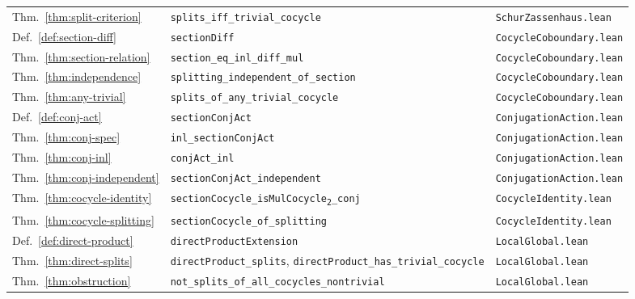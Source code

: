 \documentclass[11pt]{article}
\newcommand{\lean}[1]{\texttt{#1}}
\begin{document}
\begin{longtable}{@{}>{\raggedright\arraybackslash}p{}
  >{\raggedright\arraybackslash}p{}
  >{\raggedright\arraybackslash}p{}@{}}
Thm.~\ref{thm:split-criterion} &
  \lean{splits\_iff\_trivial\_cocycle} &
  \lean{SchurZassenhaus.lean} \\

Def.~\ref{def:section-diff} &
  \lean{sectionDiff} &
  \lean{CocycleCoboundary.lean} \\

Thm.~\ref{thm:section-relation} &
  \lean{section\_eq\_inl\_diff\_mul} &
  \lean{CocycleCoboundary.lean} \\

Thm.~\ref{thm:independence} &
  \lean{splitting\_independent\_of\_section} &
  \lean{CocycleCoboundary.lean} \\

Thm.~\ref{thm:any-trivial} &
  \lean{splits\_of\_any\_trivial\_cocycle} &
  \lean{CocycleCoboundary.lean} \\

Def.~\ref{def:conj-act} &
  \lean{sectionConjAct} &
  \lean{ConjugationAction.lean} \\

Thm.~\ref{thm:conj-spec} &
  \lean{inl\_sectionConjAct} &
  \lean{ConjugationAction.lean} \\

Thm.~\ref{thm:conj-inl} &
  \lean{conjAct\_inl} &
  \lean{ConjugationAction.lean} \\

Thm.~\ref{thm:conj-independent} &
  \lean{sectionConjAct\_independent} &
  \lean{ConjugationAction.lean} \\

Thm.~\ref{thm:cocycle-identity} &
  \lean{sectionCocycle\_isMulCocycle\textsubscript{2}\_conj} &
  \lean{CocycleIdentity.lean} \\

Thm.~\ref{thm:cocycle-splitting} &
  \lean{sectionCocycle\_of\_splitting} &
  \lean{CocycleIdentity.lean} \\

Def.~\ref{def:direct-product} &
  \lean{directProductExtension} &
  \lean{LocalGlobal.lean} \\

Thm.~\ref{thm:direct-splits} &
  \lean{directProduct\_splits}, \lean{directProduct\_has\_trivial\_cocycle} &
  \lean{LocalGlobal.lean} \\

Thm.~\ref{thm:obstruction} &
  \lean{not\_splits\_of\_all\_cocycles\_nontrivial} &
  \lean{LocalGlobal.lean} \\


\end{longtable}
\end{document}
